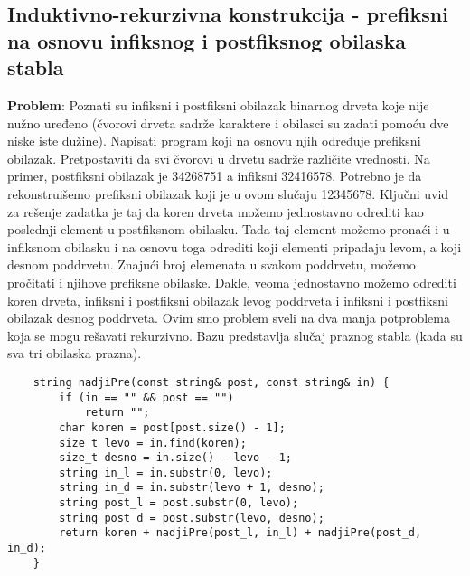 \documentclass{article}
\begin{document}
\newpage

\subsection{Induktivno-rekurzivna konstrukcija - prefiksni na osnovu infiksnog i postfiksnog obilaska stabla}
\textbf{Problem}: Poznati su infiksni i postfiksni obilazak binarnog drveta koje nije
nužno uređeno (čvorovi drveta sadrže karaktere i obilasci su zadati pomoću
dve niske iste dužine). Napisati program koji na osnovu njih određuje prefiksni
obilazak. Pretpostaviti da svi čvorovi u drvetu sadrže različite vrednosti.
\newline Na primer, postfiksni obilazak je 34268751 a infiksni 32416578. Potrebno je da rekonstruišemo prefiksni obilazak koji je u ovom slučaju 12345678.
\newline Ključni uvid za rešenje zadatka je taj da koren drveta možemo jednostavno
odrediti kao poslednji element u postfiksnom obilasku. Tada taj element možemo pronaći i u infiksnom obilasku i na osnovu toga
odrediti koji elementi pripadaju levom, a koji desnom poddrvetu. Znajući broj elemenata u svakom poddrvetu, možemo
pročitati i njihove prefiksne obilaske. Dakle,
veoma jednostavno možemo odrediti koren drveta, infiksni i postfiksni obilazak
levog poddrveta i infiksni i postfiksni obilazak desnog poddrveta. Ovim smo
problem sveli na dva manja potproblema koja se mogu rešavati rekurzivno. Bazu
predstavlja slučaj praznog stabla (kada su sva tri obilaska prazna).
\begin{lstlisting}
    string nadjiPre(const string& post, const string& in) {
        if (in == "" && post == "")
            return "";
        char koren = post[post.size() - 1];
        size_t levo = in.find(koren);
        size_t desno = in.size() - levo - 1;
        string in_l = in.substr(0, levo);
        string in_d = in.substr(levo + 1, desno);
        string post_l = post.substr(0, levo);
        string post_d = post.substr(levo, desno);
        return koren + nadjiPre(post_l, in_l) + nadjiPre(post_d, in_d);
    }
\end{lstlisting}
\end{document}
